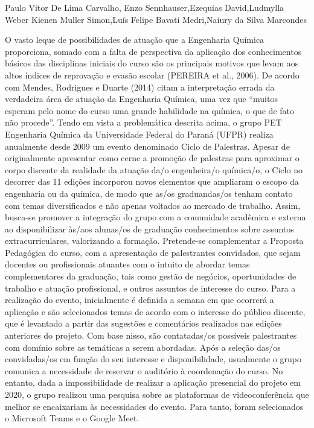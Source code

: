 Paulo Vitor De Lima Carvalho, Enzo Sennhauser,Ezequias David,Ludmylla Weber Kienen Muller Simon,Luís Felipe Bavati Medri,Naiury da Silva Marcondes

O vasto leque de possibilidades de atuação que a Engenharia Química proporciona, somado 
com a falta de perspectiva da aplicação dos conhecimentos básicos das disciplinas iniciais do curso 
são os principais motivos que levam aos altos índices de reprovação e evasão escolar (PEREIRA 
et al., 2006).
De acordo com Mendes, Rodrigues e Duarte (2014) citam a interpretação errada da 
verdadeira área de atuação da Engenharia Química, uma vez que “muitos esperam pelo nome do 
curso uma grande habilidade na química, o que de fato não procede”.
Tendo em vista a problemática descrita acima, o grupo PET Engenharia Química da 
Universidade Federal do Paraná (UFPR) realiza anualmente desde 2009 um evento denominado 
Ciclo de Palestras. Apesar de originalmente apresentar como cerne a promoção de palestras para 
aproximar o corpo discente da realidade da atuação da/o engenheira/o química/o, o Ciclo no 
decorrer das 11 edições incorporou novos elementos que ampliaram o escopo da engenharia ou da 
química, de modo que as/os graduandas/os tenham contato com temas diversificados e não apenas 
voltados ao mercado de trabalho.
Assim, busca-se promover a integração do grupo com a comunidade acadêmica e externa 
ao disponibilizar às/aos alunas/os de graduação conhecimentos sobre assuntos extracurriculares, 
valorizando a formação. Pretende-se complementar a Proposta Pedagógica do curso, com a 
apresentação de palestrantes convidados, que sejam docentes ou profissionais atuantes com o 
intuito de abordar temas complementares da graduação, tais como gestão de negócios, 
oportunidades de trabalho e atuação profissional, e outros assuntos de interesse do curso.
Para a realização do evento, inicialmente é definida a semana em que ocorrerá a aplicação 
e são selecionados temas de acordo com o interesse do público discente, que é levantado a partir 
das sugestões e comentários realizados nas edições anteriores do projeto. Com base nisso, são 
contatadas/os possíveis palestrantes com domínio sobre as temáticas a serem abordadas.
Após a seleção das/os convidadas/os em função do seu interesse e disponibilidade, 
usualmente o grupo comunica a necessidade de reservar o auditório à coordenação do curso. No 
entanto, dada a impossibilidade de realizar a aplicação presencial do projeto em 2020, o grupo 
realizou uma pesquisa sobre as plataformas de videoconferência que melhor se encaixariam às 
necessidades do evento. Para tanto, foram selecionados o Microsoft Teams e o Google Meet.
